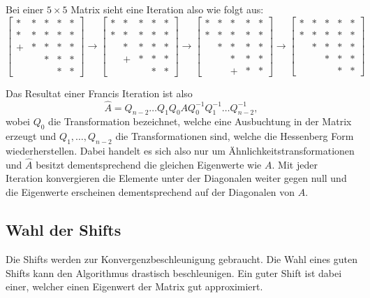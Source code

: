 Bei einer $5 \times 5$ Matrix sieht eine Iteration also wie folgt aus:
\begin{equation}
	\begin{bmatrix}
	* & * & * & * & *  \\
	* & * & *  & * & *  \\
	+ & * & * & * & *\\
	&   & * & * & * \\
	&   &   & * & * 
	\end{bmatrix} \rightarrow
	\begin{bmatrix}
	* & * & * & * & *  \\
	* & * & *  & * & *  \\
	& * & * & * & *\\
	&  + & * & * & * \\
	&   &   & * & * 
	\end{bmatrix} \rightarrow
	\begin{bmatrix}
	* & * & * & * & *  \\
	* & * & *  & * & *  \\
	& * & * & * & *\\
	&   & * & * & * \\
	&   &  + & * & * 
	\end{bmatrix} \rightarrow
	\begin{bmatrix}
	* & * & * & * & *  \\
	* & * & *  & * & *  \\
	& * & * & * & *\\
	&   & * & * & * \\
	&   &   & * & * 
	\end{bmatrix}
\end{equation}

Das Resultat einer Francis Iteration ist also
\begin{equation}
	\hat{A}=Q_{n-2}\dots Q_{1}Q_{0}AQ_{0}^{-1}Q_{1}^{-1}\dots Q_{n-2}^{-1},
\end{equation}
wobei $Q_{0}$ die Transformation bezeichnet, welche eine Ausbuchtung in der Matrix erzeugt und $Q_{1},\dots,Q_{n-2}$ die Transformationen sind, welche die Hessenberg Form wiederherstellen.
Dabei handelt es sich also nur um Ähnlichkeitstransformationen und $\hat{A}$ besitzt dementsprechend die gleichen Eigenwerte wie $A$.
Mit jeder Iteration konvergieren die Elemente unter der Diagonalen weiter gegen null und die Eigenwerte erscheinen dementsprechend auf der Diagonalen von $\hat{A}$.

\subsection{Wahl der Shifts\label{francis:section:francis_iteration:wahl_shift}}
Die Shifts werden zur Konvergenzbeschleunigung gebraucht.
Die Wahl eines guten Shifts kann den Algorithmus drastisch beschleunigen. 
Ein guter Shift ist dabei einer, welcher einen Eigenwert der Matrix gut approximiert.

